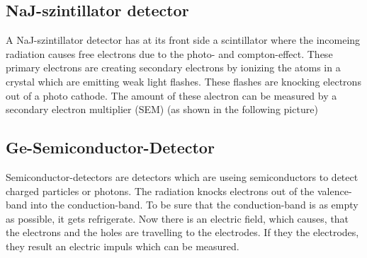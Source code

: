 \subsection{NaJ-szintillator detector}
A NaJ-szintillator detector has at its front side a scintillator where the incomeing radiation causes free electrons due to the photo- and compton-effect. These primary electrons are creating secondary electrons by ionizing the atoms in a crystal which are emitting weak light flashes. These flashes are knocking electrons out of a photo cathode. The amount of these alectron can be measured by a secondary electron multiplier (SEM) (as shown in the following picture)


\subsection{Ge-Semiconductor-Detector}
Semiconductor-detectors are detectors which are useing semiconductors to detect charged particles or photons. The radiation knocks electrons out of the valence-band into the conduction-band. To be sure that the conduction-band is as empty as possible, it gets refrigerate. Now there is an electric field, which causes, that the electrons and the holes are  travelling to the electrodes. If they the electrodes, they result an electric impuls which can be measured.
